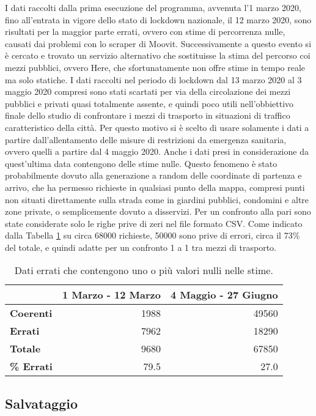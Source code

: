 I dati raccolti dalla prima esecuzione del programma, avvenuta l'1 marzo 2020, fino all'entrata in vigore dello stato di lockdown nazionale, il 12 marzo 2020, sono risultati per la maggior parte errati, ovvero con stime di percorrenza nulle, causati dai problemi con lo scraper di Moovit. Successivamente a questo evento si è cercato e trovato un servizio alternativo che sostituisse la stima del percorso coi mezzi pubblici, ovvero Here, che sfortunatamente non offre stime in tempo reale ma solo statiche. I dati raccolti nel periodo di lockdown dal 13 marzo 2020 al 3 maggio 2020 compresi sono stati scartati per via della circolazione dei mezzi pubblici e privati quasi totalmente assente, e quindi poco utili nell'obbiettivo finale dello studio di confrontare i mezzi di trasporto in situazioni di traffico caratteristico della città. Per questo motivo si è scelto di usare solamente i dati a partire dall'allentamento delle misure di restrizioni da emergenza sanitaria, ovvero quelli a partire dal 4 maggio 2020. Anche i dati presi in considerazione da quest'ultima data contengono delle stime nulle. Questo fenomeno è stato probabilmente dovuto alla generazione a random delle coordinate di partenza e arrivo, che ha permesso richieste in qualsiasi punto della mappa, compresi punti non situati direttamente sulla strada come in giardini pubblici, condomini e altre zone private, o semplicemente dovuto a disservizi. Per un confronto alla pari sono state considerate solo le righe prive di zeri nel file formato CSV. Come indicato dalla Tabella \ref{table:1} su circa 68000 richieste, 50000 sono prive di errori, circa il 73\% del totale, e quindi adatte per un confronto 1 a 1 tra mezzi di trasporto.

\begin{table}
	\centering
	\begin{tabular}{ | l | r | r | }
		\hline
		& \textbf{1 Marzo - 12 Marzo} & \textbf{4 Maggio - 27 Giugno} \\
		\hline
		\textbf{Coerenti}& 1988 & 49560 \\  
		\textbf{Errati} & 7962 & 18290 \\
		\hline
		\textbf{Totale} & 9680 & 67850 \\
		\textbf{\% Errati} & 79.5 & 27.0 \\
		\hline
	\end{tabular}
	\caption{Dati errati che contengono uno o più valori nulli nelle stime.}
	\label{table:1}
\end{table}

\subsection{Salvataggio}

